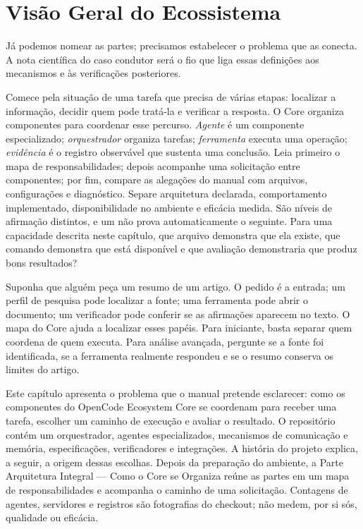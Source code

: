 \chapter{Visão Geral do Ecossistema}

Já podemos nomear as partes; precisamos estabelecer o problema que as conecta. A nota científica do caso condutor será o fio que liga essas definições aos mecanismos e às verificações posteriores.


\roteirodidatico
{Comece pela situação de uma tarefa que precisa de várias etapas: localizar a informação, decidir quem pode tratá-la e verificar a resposta. O Core organiza componentes para coordenar esse percurso.}
{\emph{Agente} é um componente especializado; \emph{orquestrador} organiza tarefas; \emph{ferramenta} executa uma operação; \emph{evidência} é o registro observável que sustenta uma conclusão.}
{Leia primeiro o mapa de responsabilidades; depois acompanhe uma solicitação entre componentes; por fim, compare as alegações do manual com arquivos, configurações e diagnóstico.}
{Separe arquitetura declarada, comportamento implementado, disponibilidade no ambiente e eficácia medida. São níveis de afirmação distintos, e um não prova automaticamente o seguinte.}
{Para uma capacidade descrita neste capítulo, que arquivo demonstra que ela existe, que comando demonstra que está disponível e que avaliação demonstraria que produz bons resultados?}

{Suponha que alguém peça um resumo de um artigo. O pedido é a entrada; um perfil de pesquisa pode localizar a fonte; uma ferramenta pode abrir o documento; um verificador pode conferir se as afirmações aparecem no texto. O mapa do Core ajuda a localizar esses papéis. Para iniciante, basta separar quem coordena de quem executa. Para análise avançada, pergunte se a fonte foi identificada, se a ferramenta realmente respondeu e se o resumo conserva os limites do artigo.}


\begin{descricao}
Este capítulo apresenta o problema que o manual pretende esclarecer: como os
componentes do OpenCode Ecosystem Core se coordenam para receber uma tarefa,
escolher um caminho de execução e avaliar o resultado. O repositório contém um
orquestrador, agentes especializados, mecanismos de comunicação e memória,
especificações, verificadores e integrações. A história do projeto explica, a seguir, a origem dessas escolhas. Depois
da preparação do ambiente, a Parte Arquitetura Integral — Como o Core se Organiza reúne as partes em um mapa de responsabilidades e acompanha o caminho de uma solicitação. Contagens de agentes, servidores e registros são fotografias do
checkout; não medem, por si sós, qualidade ou eficácia.
\end{descricao}

